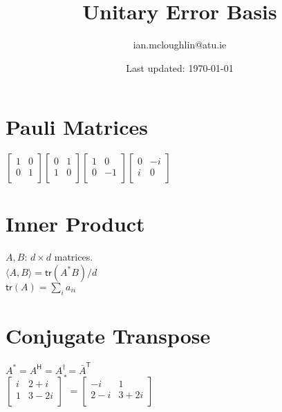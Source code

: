 \documentclass{iansnotes}
\title{Unitary Error Basis}
\author{ian.mcloughlin@atu.ie}
\date{Last updated: \today}
\begin{document}
 
\maketitle

\section{Pauli Matrices}

$\begin{bmatrix}
  1 & 0 \\
  0 & 1 \\
\end{bmatrix}
\begin{bmatrix}
  0 & 1 \\
  1 & 0 \\
\end{bmatrix}
\begin{bmatrix}
  1 & 0 \\
  0 & -1 \\
\end{bmatrix}
\begin{bmatrix}
  0 & -i \\
  i & 0 \\
\end{bmatrix}$

\section{Inner Product}
$A, B$: $d \times d$ matrices.\\[2mm]
$\langle A, B \rangle = \textsf{tr}(A^* B) / d$\\[2mm]
$\textsf{tr}(A) = \sum_i a_{ii}$

\section{Conjugate Transpose}

$A^* = A^\textsf{H} = A^\dagger = \bar{A}^\textsf{T}$\\[4mm]
$\begin{bmatrix}
  i & 2+i \\
  1 & 3-2i \\
\end{bmatrix}^* = 
\begin{bmatrix}
  -i & 1 \\
  2-i & 3+2i \\
\end{bmatrix}$
\end{document}
